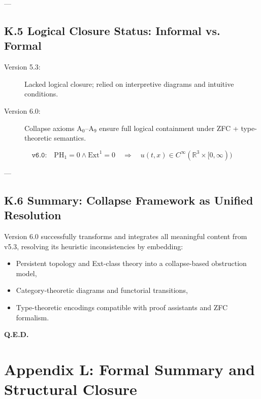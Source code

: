 \documentclass[11pt]{article}
\begin{document}
---

\subsection*{K.5 Logical Closure Status: Informal vs. Formal}

\begin{description}
  \item[Version 5.3:]  
  Lacked logical closure; relied on interpretive diagrams and intuitive conditions.

  \item[Version 6.0:]  
  Collapse axioms \( \mathrm{A}_0 \)–\( \mathrm{A}_9 \) ensure full logical containment  
  under ZFC + type-theoretic semantics.
\end{description}

\[
\texttt{v6.0:} \quad
\mathrm{PH}_1 = 0 \land \mathrm{Ext}^1 = 0
\quad \Rightarrow \quad
u(t,x) \in C^\infty(\mathbb{R}^3 \times [0,\infty))
\]

---

\subsection*{K.6 Summary: Collapse Framework as Unified Resolution}

Version 6.0 successfully transforms and integrates all meaningful content from v5.3,  
resolving its heuristic inconsistencies by embedding:

\begin{itemize}
  \item Persistent topology and Ext-class theory into a collapse-based obstruction model,
  \item Category-theoretic diagrams and functorial transitions,
  \item Type-theoretic encodings compatible with proof assistants and ZFC formalism.
\end{itemize}

\begin{flushright}
\textbf{Q.E.D.}
\end{flushright}




\section*{Appendix L: Formal Summary and Structural Closure}
\end{document}
